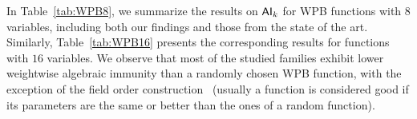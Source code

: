 \documentclass[11pt]{llncs}
\begin{document}
In Table~\ref{tab:WPB8}, we summarize the results on $\AIk{k}$ for WPB functions with $8$ variables, including both our findings and those from the state of the art.  
Similarly, Table~\ref{tab:WPB16} presents the corresponding results for functions with $16$ variables.  
We observe that most of the studied families exhibit lower weightwise algebraic immunity than a randomly chosen WPB function, with the exception of the field order construction~\cite{SAC:Meaux24} (usually a function is considered good if its parameters are the same or better than the ones of a random function).


\begin{table}[H]
	\center 
	\caption{$\AIk{k}$ of WPB functions in $8$ variables.}
	\label{tab:WPB8}
\end{table}
\end{document}
